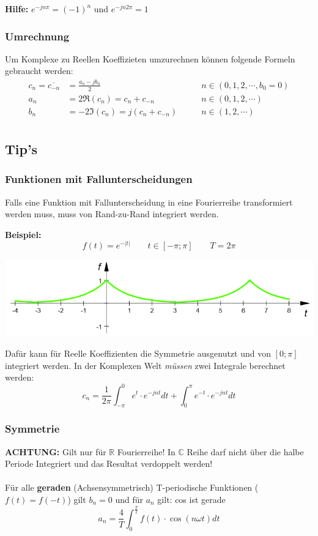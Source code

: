 \noindent\textbf{Hilfe:} $e^{-jn\pi} = (-1)^n$ und $e^{-jn2\pi} = 1$

\subsubsection{Umrechnung}\label{umrechnung}
Um Komplexe zu Reellen Koeffizieten umzurechnen können folgende Formeln gebraucht werden:
\begin{align*}
	c_n = \overline{c_{-n}} &= \frac{a_n - jb_n}{2} &\qquad n \in (0,1,2, \cdots, b_0 = 0) \\
	a_n &= 2\Re(c_n) = c_n + c_{-n}  &\qquad n \in (0,1,2, \cdots) \\
	b_n &= -2\Im(c_n) = j(c_n + c_{-n}) &\qquad n \in (1,2, \cdots) \\
\end{align*}

\subsection{Tip's}\label{tip}
\subsubsection{Funktionen mit Fallunterscheidungen}
Falls eine Funktion mit Fallunterscheidung in eine Fourierreihe transformiert werden muss, muss von Rand-zu-Rand integriert werden.

\noindent\textbf{Beispiel:}
\[
f(t)= e^{-\left|t\right|} \qquad t \in [-\pi;\pi] \qquad T = 2\pi
\]
\begin{center}
	\includegraphics[width=0.6\columnwidth]{Images/beispiel_e_cn}
\end{center}

\noindent Dafür kann für Reelle Koeffizienten die Symmetrie ausgenutzt und von $[0;\pi]$ integriert werden. In der Komplexen Welt \textit{müssen} zwei Integrale berechnet werden:
\[
c_n = \frac{1}{2\pi}\int_{-\pi}^{0}e^t\cdot e^{-jnt}dt + \int_{0}^{\pi}e^{-t}\cdot e^{-jnt}dt
\]

\subsubsection{Symmetrie}
\textbf{ACHTUNG:} Gilt nur für $\mathbb{R}$ Fourierreihe! In $\mathbb{C}$ Reihe darf nicht über die halbe Periode Integriert und das Resultat verdoppelt werden! 
~\\
~\\
\noindent Für alle \textbf{geraden} (Achsensymmetrisch) T-periodische Funktionen ($f(t) = f(-t)$)  gilt $b_n = 0$ und für $a_n$ gilt: cos ist gerade 
\[
a_n = \frac{4}{T}\int_{0}^{\frac{T}{2}}f(t) \cdot \cos(n\omega t)dt
\]

